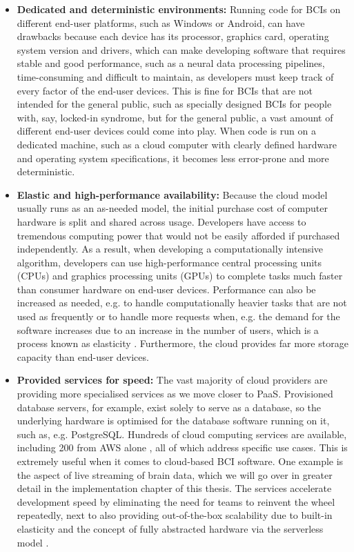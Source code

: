 \begin{itemize}
  \item \textbf{Dedicated and deterministic environments:} Running code for BCIs on different end-user platforms, such as Windows or Android, can have drawbacks because each device has its processor, graphics card, operating system version and drivers, which can make developing software that requires stable and good performance, such as a neural data processing pipelines, time-consuming and difficult to maintain, as developers must keep track of every factor of the end-user devices. This is fine for BCIs that are not intended for the general public, such as specially designed BCIs for people with, say, locked-in syndrome, but for the general public, a vast amount of different end-user devices could come into play. When code is run on a dedicated machine, such as a cloud computer with clearly defined hardware and operating system specifications, it becomes less error-prone and more deterministic.
  \item \textbf{Elastic and high-performance availability:} Because the cloud model usually runs as an as-needed model, the initial purchase cost of computer hardware is split and shared across usage. Developers have access to tremendous computing power that would not be easily afforded if purchased independently. As a result, when developing a computationally intensive algorithm, developers can use high-performance central processing units (CPUs) and graphics processing units (GPUs) to complete tasks much faster than consumer hardware on end-user devices. Performance can also be increased as needed, e.g. to handle computationally heavier tasks that are not used as frequently or to handle more requests when, e.g. the demand for the software increases due to an increase in the number of users, which is a process known as elasticity \citep{gartner_definition_nodate}. Furthermore, the cloud provides far more storage capacity than end-user devices.

  \item \textbf{Provided services for speed:} The vast majority of cloud providers are providing more specialised services as we move closer to PaaS. Provisioned database servers, for example, exist solely to serve as a database, so the underlying hardware is optimised for the database software running on it, such as, e.g. PostgreSQL. Hundreds of cloud computing services are available, including 200 from AWS alone \citep{amazon_web_services_inc_what_nodate}, all of which address specific use cases. This is extremely useful when it comes to cloud-based BCI software. One example is the aspect of live streaming of brain data, which we will go over in greater detail in the implementation chapter of this thesis. The services accelerate development speed by eliminating the need for teams to reinvent the wheel repeatedly, next to also providing out-of-the-box scalability due to built-in elasticity and the concept of fully abstracted hardware via the serverless model  \citep{redhat_what_2022}.
\end{itemize}

